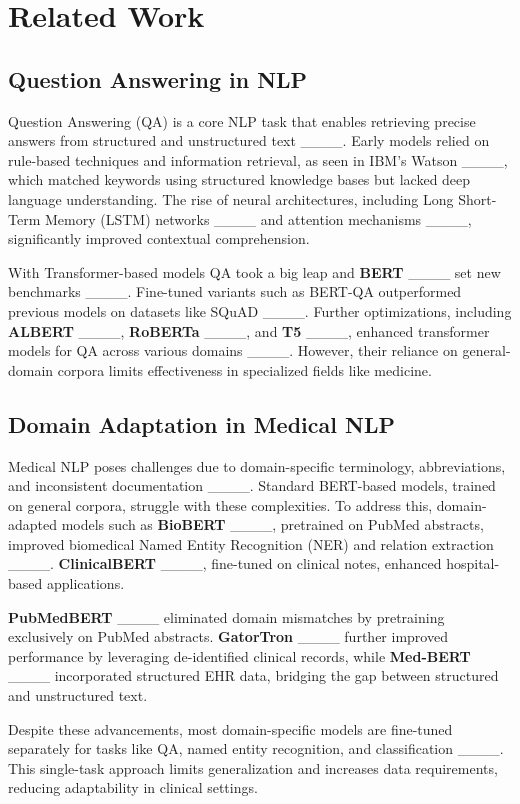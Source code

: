 \section{Related Work}
\subsection{Question Answering in NLP}
Question Answering (QA) is a core NLP task that enables retrieving precise answers from structured and unstructured text ____. Early models relied on rule-based techniques and information retrieval, as seen in IBM's Watson ____, which matched keywords using structured knowledge bases but lacked deep language understanding. The rise of neural architectures, including Long Short-Term Memory (LSTM) networks ____ and attention mechanisms ____, significantly improved contextual comprehension.

With Transformer-based models QA took a big leap and \textbf{BERT} ____ set new benchmarks ____. Fine-tuned variants such as BERT-QA outperformed previous models on datasets like SQuAD ____. Further optimizations, including \textbf{ALBERT} ____, \textbf{RoBERTa} ____, and \textbf{T5} ____, enhanced transformer models for QA across various domains ____. However, their reliance on general-domain corpora limits effectiveness in specialized fields like medicine.


\subsection{Domain Adaptation in Medical NLP}
Medical NLP poses challenges due to domain-specific terminology, abbreviations, and inconsistent documentation ____. Standard BERT-based models, trained on general corpora, struggle with these complexities. To address this, domain-adapted models such as \textbf{BioBERT} ____, pretrained on PubMed abstracts, improved biomedical Named Entity Recognition (NER) and relation extraction ____. \textbf{ClinicalBERT} ____, fine-tuned on clinical notes, enhanced hospital-based applications.

\textbf{PubMedBERT} ____ eliminated domain mismatches by pretraining exclusively on PubMed abstracts. \textbf{GatorTron} ____ further improved performance by leveraging de-identified clinical records, while \textbf{Med-BERT} ____ incorporated structured EHR data, bridging the gap between structured and unstructured text.

Despite these advancements, most domain-specific models are fine-tuned separately for tasks like QA, named entity recognition, and classification ____. This single-task approach limits generalization and increases data requirements, reducing adaptability in clinical settings.



